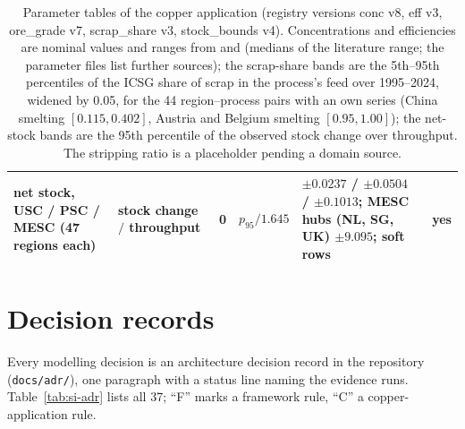 \documentclass[11pt]{article}
\begin{document}
\begin{table}[h]
\begin{tabular}{@{}llllll@{}}
net stock, USC / PSC / MESC (47 regions each) & stock change $/$ throughput & 0 & $p_{95}/1.645$ & $\pm 0.0237$ / $\pm 0.0504$ / $\pm 0.1013$; MESC hubs (NL, SG, UK) $\pm 9.095$; soft rows & yes \\
\bottomrule
\end{tabular}
\caption{Parameter tables of the copper application (registry versions conc
v8, eff v3, ore\_grade v7, scrap\_share v3, stock\_bounds v4).
Concentrations and efficiencies are nominal values and ranges from
\citet{schlesinger2022extractive} and \citet{davenport2002extractive}
(medians of the literature range; the parameter files list further
sources); the scrap-share bands are the 5th--95th percentiles of the ICSG
share of scrap in the process's feed over 1995--2024, widened by 0.05, for
the 44 region--process pairs with an own series (China smelting
$[0.115, 0.402]$, Austria and Belgium smelting $[0.95, 1.00]$); the
net-stock bands are the 95th percentile of the observed stock change over
throughput. The stripping ratio is a placeholder pending a domain source.}
\label{tab:si-params}
\end{table}

\section{Decision records}\label{si:decisions}

Every modelling decision is an architecture decision record in the
repository (\texttt{docs/adr/}), one paragraph with a status line naming the
evidence runs. Table~\ref{tab:si-adr} lists all 37; ``F'' marks a framework
rule, ``C'' a copper-application rule.
\end{document}
